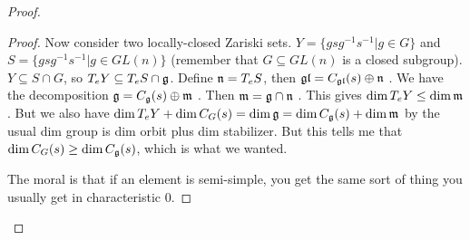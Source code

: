 \begin{proof}
\begin{proof}
  Now consider two locally-closed Zariski sets. $Y=\{gsg^{-1}s^{-1}|g\in G\}$ and $S=\{gsg^{-1}s^{-1}|g\in GL(n)\}$ (remember that $G\subseteq GL(n)$ is a closed subgroup). $Y\subseteq S\cap G$, so $T_eY\subseteq T_e S\cap \mathfrak{g}$. Define $\mathfrak{n}=T_e S$, then $\mathfrak{gl}=C_{\mathfrak{gl}}(s)\oplus \mathfrak{n}$ . We have the decomposition $\mathfrak{g}=C_{\mathfrak{g}}(s)\oplus \mathfrak{m}$ . Then $\mathfrak{m}=\mathfrak{g}\cap \mathfrak{n}$ . This gives $\dim T_eY\le \dim \mathfrak{m}$. But we also have $\dim T_e Y+\dim C_G(s)=\dim \mathfrak{g}=\dim C_{\mathfrak{g}}(s)+\dim \mathfrak{m}$ by the usual dim group is dim orbit plus dim stabilizer. But this tells me that $\dim C_G(s)\ge \dim C_{\mathfrak{g}}(s)$, which is what we wanted.
  
  The moral is that if an element is semi-simple, you get the same sort of thing you usually get in characteristic 0. 
 \end{proof}

\end{proof}